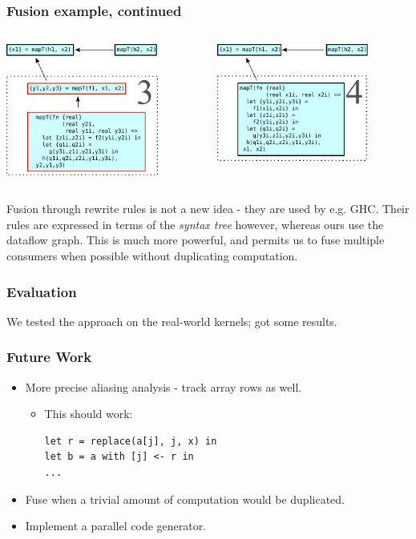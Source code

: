\documentclass{beamer}
\begin{document}
\begin{frame}[t]
  \frametitle{Fusion example, continued}

  \centering
  \begin{columns}
    \begin{column}[T]{0.48\textwidth}
      \includegraphics[width=5cm]{img/fusion-3.pdf}
    \end{column}\hfill
    \begin{column}[T]{0.48\textwidth}
      \includegraphics[width=5cm]{img/fusion-4.pdf}
    \end{column}
  \end{columns}

  Fusion through rewrite rules is not a new idea - they are used by
  e.g.  GHC.  Their rules are expressed in terms of the \textit{syntax
    tree} however, whereas ours use the dataflow graph.  This is much
  more powerful, and permits us to fuse multiple consumers when
  possible without duplicating computation.

\end{frame}

\begin{frame}
  \frametitle{Evaluation}

  We tested the approach on the real-world kernels; got some results.
\end{frame}

\begin{frame}[fragile]
  \frametitle{Future Work}

  \begin{itemize}
  \item More precise aliasing analysis - track array rows as well.
    \begin{itemize}
    \item This should work:
      \begin{lstlisting}
let r = replace(a[j], j, x) in
let b = a with [j] <- r in
...
\end{lstlisting}
\end{itemize}

\item Fuse when a trivial amount of computation would be duplicated.
\item Implement a parallel code generator.
\end{itemize}
\end{frame}
\end{document}
